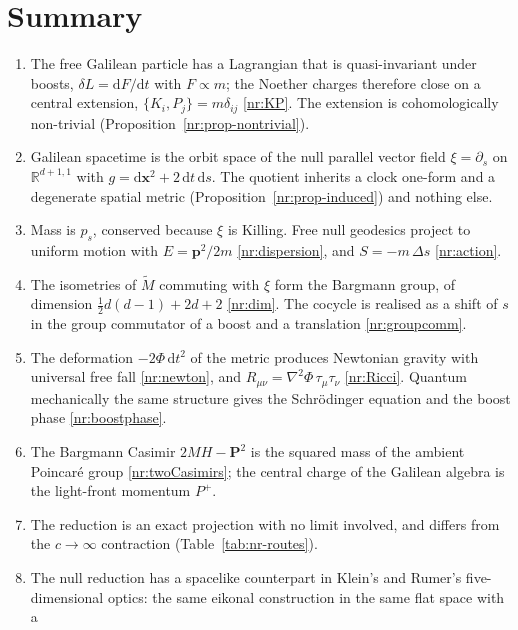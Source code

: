\section{Summary}
\label{sec:nr-summary}

\begin{enumerate}
\item The free Galilean particle has a Lagrangian that is quasi-invariant under
boosts, $\delta L=\mathrm{d}F/\mathrm{d}t$ with $F\propto m$; the Noether
charges therefore close on a central extension, $\{K_i,P_j\}=m\delta_{ij}$
\eqref{nr:KP}. The extension is cohomologically non-trivial
(Proposition~\ref{nr:prop-nontrivial}).
\item Galilean spacetime is the orbit space of the null parallel vector field
$\xi=\partial_s$ on $\mathbb{R}^{d+1,1}$ with $g=\mathrm{d}\mathbf{x}^2+2\,\mathrm{d}t\,\mathrm{d}s$. The
quotient inherits a clock one-form and a degenerate spatial metric
(Proposition~\ref{nr:prop-induced}) and nothing else.
\item Mass is $p_s$, conserved because $\xi$ is Killing. Free null geodesics
project to uniform motion with $E=\mathbf{p}^2/2m$ \eqref{nr:dispersion}, and
$S=-m\,\Delta s$ \eqref{nr:action}.
\item The isometries of $\tilde M$ commuting with $\xi$ form the Bargmann group,
of dimension $\tfrac12d(d-1)+2d+2$ \eqref{nr:dim}. The cocycle is realised as a shift
of $s$ in the group commutator of a boost and a translation \eqref{nr:groupcomm}.
\item The deformation $-2\Phi\,\mathrm{d}t^2$ of the metric produces Newtonian
gravity with universal free fall \eqref{nr:newton}, and $R_{\mu\nu}=\nabla^2\Phi\,\tau_\mu\tau_\nu$
\eqref{nr:Ricci}. Quantum mechanically the same structure gives the
Schr\"odinger equation and the boost phase \eqref{nr:boostphase}.
\item The Bargmann Casimir $2MH-\mathbf{P}^2$ is the squared mass of the
ambient Poincar\'e group \eqref{nr:twoCasimirs}; the central charge of the
Galilean algebra is the light-front momentum $P^+$.
\item The reduction is an exact projection with no limit involved, and differs
from the $c\to\infty$ contraction (Table~\ref{tab:nr-routes}).
\item The null reduction has a spacelike counterpart in Klein's and Rumer's
five-dimensional optics: the same eikonal construction in the same flat space with a

\end{enumerate}
